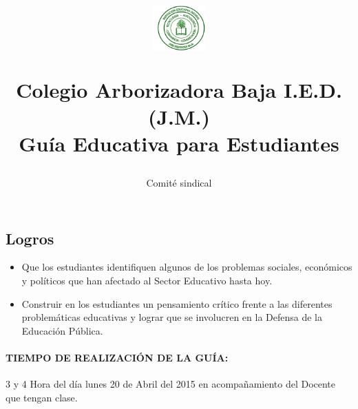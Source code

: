 \documentclass[10pt,twoside]{article}
\author{Comité sindical}
\title{\begin{minipage}{.2\textwidth}
\includegraphics[height=1.75cm]{Images/logo-colegio.png}\end{minipage}
\begin{minipage}{.75\textwidth}
\begin{center}
Colegio Arborizadora Baja I.E.D. (J.M.)\\
Guía Educativa para Estudiantes\\
\end{center}
\end{minipage}\hfill
}
\date{}
\begin{document}
\maketitle
\subsection*{Logros}
\begin{itemize}
\item Que los estudiantes identifiquen algunos de los problemas sociales, económicos y políticos  que han afectado al Sector Educativo hasta hoy.
\item Construir en los estudiantes un pensamiento crítico frente a las diferentes problemáticas educativas y lograr que se involucren en la Defensa de la Educación Pública.
\end{itemize}
\paragraph*{TIEMPO DE REALIZACIÓN DE LA GUÍA:} 3 y 4 Hora del día lunes 20 de Abril del 2015 en acompañamiento del Docente que tengan clase.
\end{document}
